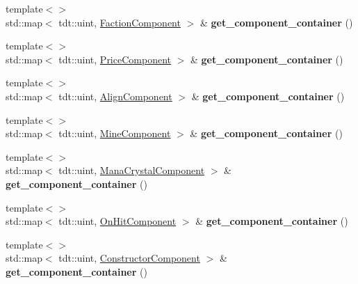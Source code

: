 \begin{DoxyCompactItemize}
\item 
{\footnotesize template$<$$>$ }\\std\+::map$<$ tdt\+::uint, \hyperlink{struct_faction_component}{Faction\+Component} $>$ \& {\bfseries get\+\_\+component\+\_\+container} ()\hypertarget{class_entity_system_acd9c209334726b9dd77de42d9b612a8c}{}\label{class_entity_system_acd9c209334726b9dd77de42d9b612a8c}

\item 
{\footnotesize template$<$$>$ }\\std\+::map$<$ tdt\+::uint, \hyperlink{struct_price_component}{Price\+Component} $>$ \& {\bfseries get\+\_\+component\+\_\+container} ()\hypertarget{class_entity_system_a085928660036f87f38a7622b0e381706}{}\label{class_entity_system_a085928660036f87f38a7622b0e381706}

\item 
{\footnotesize template$<$$>$ }\\std\+::map$<$ tdt\+::uint, \hyperlink{struct_align_component}{Align\+Component} $>$ \& {\bfseries get\+\_\+component\+\_\+container} ()\hypertarget{class_entity_system_a58ab65cb9e0a2f737c7b64e2c873eb8f}{}\label{class_entity_system_a58ab65cb9e0a2f737c7b64e2c873eb8f}

\item 
{\footnotesize template$<$$>$ }\\std\+::map$<$ tdt\+::uint, \hyperlink{struct_mine_component}{Mine\+Component} $>$ \& {\bfseries get\+\_\+component\+\_\+container} ()\hypertarget{class_entity_system_ab877cdb98f2d76e5e42d3bd7f632b980}{}\label{class_entity_system_ab877cdb98f2d76e5e42d3bd7f632b980}

\item 
{\footnotesize template$<$$>$ }\\std\+::map$<$ tdt\+::uint, \hyperlink{struct_mana_crystal_component}{Mana\+Crystal\+Component} $>$ \& {\bfseries get\+\_\+component\+\_\+container} ()\hypertarget{class_entity_system_a723cdf78d9ac16489a2d74515d30bb89}{}\label{class_entity_system_a723cdf78d9ac16489a2d74515d30bb89}

\item 
{\footnotesize template$<$$>$ }\\std\+::map$<$ tdt\+::uint, \hyperlink{struct_on_hit_component}{On\+Hit\+Component} $>$ \& {\bfseries get\+\_\+component\+\_\+container} ()\hypertarget{class_entity_system_a417f0ec395e909bf4f25f229b5c75708}{}\label{class_entity_system_a417f0ec395e909bf4f25f229b5c75708}

\item 
{\footnotesize template$<$$>$ }\\std\+::map$<$ tdt\+::uint, \hyperlink{struct_constructor_component}{Constructor\+Component} $>$ \& {\bfseries get\+\_\+component\+\_\+container} ()\hypertarget{class_entity_system_aceca061a4a029c3098161812283cafd3}{}\label{class_entity_system_aceca061a4a029c3098161812283cafd3}


\end{DoxyCompactItemize}
